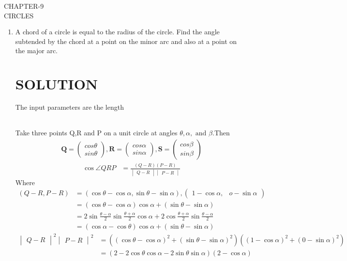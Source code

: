 \documentclass[12pt]{article}
\newcommand{\mydet}[1]{\ensuremath{\begin{vmatrix}#1\end{vmatrix}}}
\newcommand{\myvec}[1]{\ensuremath{\begin{pmatrix}#1\end{pmatrix}}}
\let\vec\mathbf
\begin{document}
\begin{center}
\textbf\large{CHAPTER-9 \\ CIRCLES}

\end{center}
\begin{enumerate}
\section{EXERCISE-10.5}
\item A chord of a circle is equal to the radius of the circle. Find the angle subtended by the chord at a point on the minor arc and also at a point on the major arc.
\section{SOLUTION}
The input parameters are the length\\
\begin{table}[h!]
	
\caption{}
\label{table}	
\end{table}
\\
Take three points Q,R and P on a unit circle  at angles $\theta,\alpha,\text{ and }\beta$.Then
\begin{align}
	\vec{Q} = \myvec{cos\theta\\sin\theta},
	\vec{R} = \myvec{cos\alpha\\sin\alpha},
	\vec{S} = \myvec{cos\beta\\sin\beta}
\end{align}
\begin{align}
	\cos\angle QRP&= \frac{(Q-R)(P-R)}{\mydet{Q-R}\mydet{P-R}}\label{2}
\end{align}
Where
\begin{align}
(Q-R, P-R)&= (\cos\theta-\cos\alpha,\sin\theta-\sin\alpha),\myvec{1-\cos\alpha,& o-\sin\alpha}\\
&=(\cos\theta-\cos\alpha)\cos\alpha+(\sin\theta-\sin\alpha)\\
&=2\sin\frac{\theta-\alpha}{2}\sin\frac{\theta+\alpha}{2}\cos\alpha+2\cos\frac{\theta+\alpha}{2}\sin\frac{\theta-\alpha}{2}\\
&=(\cos\alpha-\cos\theta)\cos\alpha+(\sin\theta-\sin\alpha)\label{6}
\end{align}
\begin{align}
\mydet{Q-R}^2\mydet{P-R}^2 &= ((\cos\theta-\cos\alpha)^2+(\sin\theta-\sin\alpha)^2)
	((1-\cos\alpha)^2+(0-\sin\alpha)^2)\\
	&=(2-2\cos\theta\cos\alpha-2\sin\theta\sin\alpha)(2-\cos\alpha)\label{8}

\end{align}
\end{enumerate}
\end{document}
